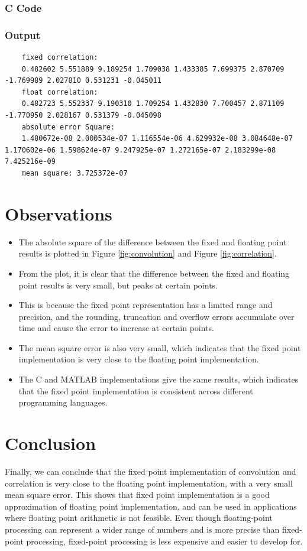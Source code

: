 \documentclass[a4paper,12pt]{article}
\begin{document}
\subsubsection{C Code}



\subsubsection{Output}
\begin{lstlisting}
    fixed correlation:
    0.482602 5.551889 9.189254 1.709038 1.433385 7.699375 2.870709 -1.769989 2.027810 0.531231 -0.045011 
    float correlation:
    0.482723 5.552337 9.190310 1.709254 1.432830 7.700457 2.871109 -1.770950 2.028167 0.531379 -0.045098 
    absolute error Square:
    1.480672e-08 2.000534e-07 1.116554e-06 4.629932e-08 3.084648e-07 1.170602e-06 1.598624e-07 9.247925e-07 1.272165e-07 2.183299e-08 7.425216e-09 
    mean square: 3.725372e-07
\end{lstlisting}

\section{Observations}
\begin{itemize}
    \item The absolute square of the difference between the fixed and floating point results is plotted in Figure \ref{fig:convolution} and Figure \ref{fig:correlation}.
    \item From the plot, it is clear that the difference between the fixed and floating point results is very small, but peaks at certain points.
    \item This is because the fixed point representation has a limited range and precision, and the rounding, truncation and overflow errors accumulate over time and cause the error to increase at certain points.
    \item The mean square error is also very small, which indicates that the fixed point implementation is very close to the floating point implementation.
    \item The C and MATLAB implementations give the same results, which indicates that the fixed point implementation is consistent across different programming languages.
\end{itemize}

\section{Conclusion}

Finally, we can conclude that the fixed point implementation of convolution and correlation is very close to the floating point implementation, with a very small mean square error. This shows that fixed point 
implementation is a good approximation of floating point implementation, and can be used in applications where floating point arithmetic is not feasible.
Even though floating-point processing can represent a wider range of numbers and is more precise than fixed-point processing, fixed-point processing is less expensive and easier to develop for.
\end{document}
